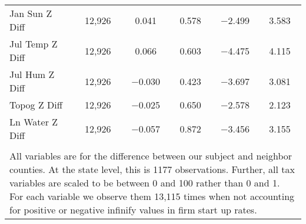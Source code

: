 \begin{table}[!htbp]
\begin{tabular}{@{\extracolsep{5pt}}lccccc}
Jan Sun Z Diff & 12,926 & 0.041 & 0.578 & $-$2.499 & 3.583 \\ 
Jul Temp Z Diff & 12,926 & 0.066 & 0.603 & $-$4.475 & 4.115 \\ 
Jul Hum Z Diff & 12,926 & $-$0.030 & 0.423 & $-$3.697 & 3.081 \\ 
Topog Z Diff & 12,926 & $-$0.025 & 0.650 & $-$2.578 & 2.123 \\ 
Ln Water Z Diff & 12,926 & $-$0.057 & 0.872 & $-$3.456 & 3.155 \\ 
\hline \\[-1.8ex] 
\multicolumn{6}{l}{All variables are for the difference between our subject and neighbor counties. At the state level, this is 1177 observations. Further, all tax variables are scaled to be between 0 and 100 rather than 0 and 1. For each variable we observe them 13,115 times when not accounting for positive or negative infinify values in firm start up rates.} \\ 
\end{tabular} 
\end{table} 
